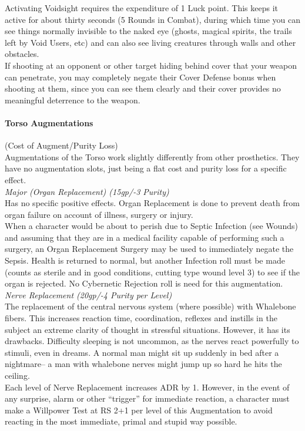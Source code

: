 \documentclass[a4paper, twocolumn, openany]{book}
\newlength{\indentlen}
\newcommand{\tabto}[1]{\setlength{\leftskip}{#1\indentlen}}
\begin{document}
{	Activating Voidsight requires the expenditure of 1 Luck point. This keeps it active for about thirty
	seconds (5 Rounds in Combat), during which time you can see things normally invisible to the
	naked eye (ghosts, magical spirits, the trails left by Void Users, etc) and can also see living
	creatures through walls and other obstacles.\\
	If shooting at an opponent or other target hiding behind cover that your weapon can penetrate,
	you may completely negate their Cover Defense bonus when shooting at them, since you can
	see them clearly and their cover provides no meaningful deterrence to the weapon.\\

\tabto{0}\newpage
\paragraph{Torso Augmentations} (Cost of Augment/Purity Loss)\\
Augmentations of the Torso work slightly differently from other prosthetics. They have no
augmentation slots, just being a flat cost and purity loss for a specific effect.\\

\tabto{1}
	{\slshape Major (Organ Replacement) (15gp/-3 Purity)\\}
	Has no specific positive effects. Organ Replacement is done to prevent death from organ failure
	on account of illness, surgery or injury.\\
	When a character would be about to perish due to Septic Infection (see Wounds) and assuming
	that they are in a medical facility capable of performing such a surgery, an Organ Replacement
	Surgery may be used to immediately negate the Sepsis. Health is returned to normal, but
	another Infection roll must be made (counts as sterile and in good conditions, cutting type
	wound level 3) to see if the organ is rejected. No Cybernetic Rejection roll is need for this
	augmentation.\\

	{\slshape Nerve Replacement (20gp/-4 Purity per Level)\\}
	The replacement of the central nervous system (where possible) with Whalebone fibers. This
	increases reaction time, coordination, reflexes and instills in the subject an extreme clarity of
	thought in stressful situations. However, it has its drawbacks. Difficulty sleeping is not
	uncommon, as the nerves react powerfully to stimuli, even in dreams. A normal man might sit up
	suddenly in bed after a nightmare-- a man with whalebone nerves might jump up so hard he hits
	the ceiling.\\
	Each level of Nerve Replacement increases ADR by 1. However, in the event of any surprise,
	alarm or other “trigger” for immediate reaction, a character must make a Willpower Test at RS
	2+1 per level of this Augmentation to avoid reacting in the most immediate, primal and stupid
	way possible.\\

}
\end{document}
